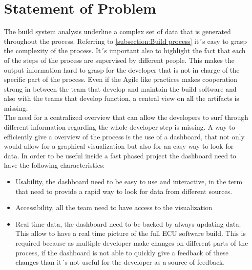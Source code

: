 \documentclass[../main.tex]{subfiles}
\begin{document}
\section{Statement of Problem}
The build system analysis underline a complex set of data that is generated throughout the process. Referring to \ref{subsection:Build process} it´s easy to grasp the complexity of the process. It´s important also to highlight the fact that each of the steps of the process are supervised by different people. This makes the output information hard to grasp for the developer that is not in charge of the specific part of the process. Even if the Agile like practices makes cooperation strong in between the team that develop and maintain the build software and also with the teams that develop function, a central view on all the artifacts is missing.\\
The need for a centralized overview that can allow the developers to surf through different information regarding the whole developer step is missing. A way to efficiently give a overview of the process is the use of a dashboard, that not only would allow for a graphical visualization but also for an easy way to look for data. In order to be useful inside a fast phased project the dashboard need to have the following characteristics:
\begin{itemize}
    \item Usability, the dashboard need to be easy to use and interactive, in the term that need to provide a rapid way to look for data from different sources. 
    \item Accessibility, all the team need to have access to the visualization
    \item Real time data, the dashboard need to be backed by always updating data. This allow to have a real time picture of the full ECU software build. This is required because as multiple developer make changes on different parts of the process, if the dashboard is not able to quickly give a feedback of these changes than it´s not useful for the developer as a source of feedback. 
\end{itemize}
\end{document}
